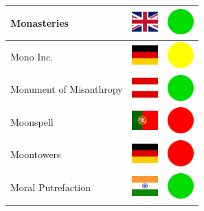 \documentclass[12pt, a4paper, twoside]{report}
\begin{document}
\begin{center}
\begin{longtable}{|p{5cm}|p{2cm}|p{2cm}|}
Monasteries & \includegraphics[width=1cm]{4x3/gb} & \includegraphics[width=1cm]{likes/y} \\ \hline
Mono Inc. & \includegraphics[width=1cm]{4x3/de} & \includegraphics[width=1cm]{likes/m} \\ \hline
Monument of Misanthropy & \includegraphics[width=1cm]{4x3/at} & \includegraphics[width=1cm]{likes/y} \\ \hline
Moonspell & \includegraphics[width=1cm]{4x3/pt} & \includegraphics[width=1cm]{likes/n} \\ \hline
Moontowers & \includegraphics[width=1cm]{4x3/de} & \includegraphics[width=1cm]{likes/n} \\ \hline
Moral Putrefaction & \includegraphics[width=1cm]{4x3/in} & \includegraphics[width=1cm]{likes/y} \\ \hline

\end{longtable}
\end{center}
\end{document}
